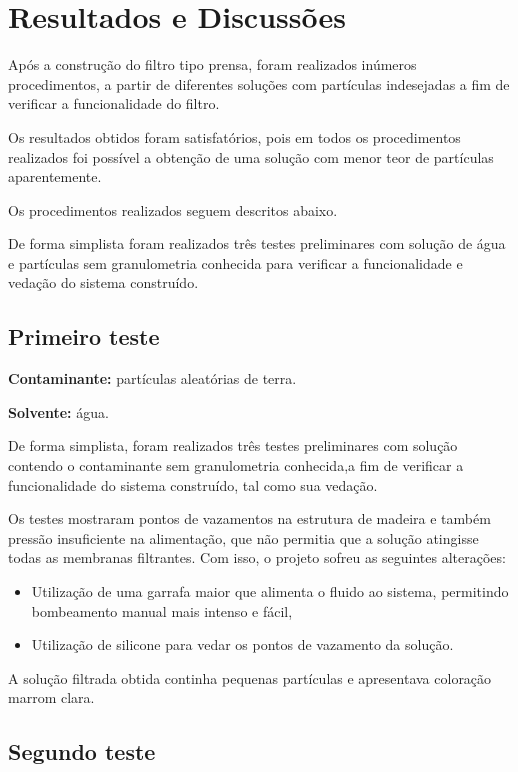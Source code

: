 \chapter{Resultados e Discussões}
\label{chap:resultados}

Após a construção do filtro tipo prensa, foram realizados inúmeros
procedimentos, a partir de diferentes soluções com partículas indesejadas a fim
de verificar a funcionalidade do filtro.

Os resultados obtidos foram satisfatórios, pois em todos os procedimentos
realizados foi possível a obtenção de uma solução com menor teor de partículas
aparentemente.

Os procedimentos realizados seguem descritos abaixo.

De forma simplista foram realizados três testes preliminares com solução de água
e partículas sem granulometria conhecida para verificar a funcionalidade e
vedação do sistema construído.


\section{Primeiro teste}
\label{sec:proc1}

\textbf{Contaminante:} partículas aleatórias de terra.

\textbf{Solvente:} água.

De forma simplista, foram realizados três testes preliminares com solução
contendo o contaminante sem granulometria conhecida,a fim de verificar
a funcionalidade do sistema construído, tal como sua vedação.

Os testes mostraram pontos de vazamentos na estrutura de madeira e também
pressão insuficiente na alimentação, que não permitia que a solução atingisse
todas as membranas filtrantes. Com isso, o projeto sofreu as seguintes
alterações:

\begin{itemize}
\item Utilização de uma garrafa maior que alimenta o fluido ao sistema,
  permitindo bombeamento manual mais intenso e fácil,
\item Utilização de silicone para vedar os pontos de vazamento da solução.
\end{itemize}

A solução filtrada obtida continha pequenas partículas e apresentava coloração
marrom clara.


\section{Segundo teste}
\label{sec:proc2}

